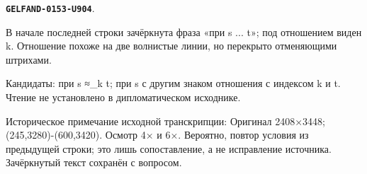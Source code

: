 \documentclass[11pt]{article}
\theoremstyle{definition}
\theoremstyle{remark}
\begin{document}
\par\noindent\leavevmode{}\label{GELFAND-0153-U904}\label{GELFAND-P001414:eq14-cancelled-condition:note}\textbf{\texttt{GELFAND-0153-U904}}.\nopagebreak[4]\par
В начале последней строки зачёркнута фраза «при s ... t»; под отношением виден k. Отношение похоже на две волнистые линии, но перекрыто отменяющими штрихами.\par
Кандидаты: при s ≈\_k t; при s с другим знаком отношения с индексом k и t. Чтение не установлено в дипломатическом исходнике.\par
Историческое примечание исходной транскрипции: Оригинал 2408×3448; (245,3280)-(600,3420). Осмотр 4× и 6×. Вероятно, повтор условия из предыдущей строки; это лишь сопоставление, а не исправление источника. Зачёркнутый текст сохранён с вопросом.\par\medskip
\end{document}
